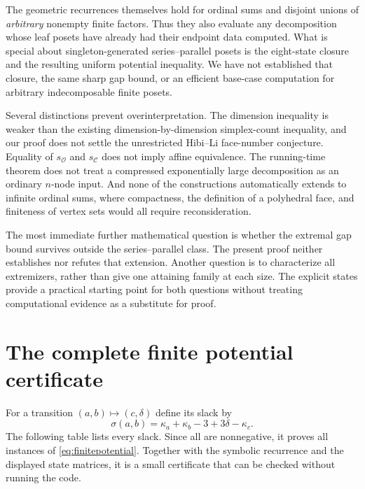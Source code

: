 \documentclass[11pt]{article}
\theoremstyle{definition}
\newcommand{\OO}{\mathcal O}
\newcommand{\CC}{\mathcal C}
\newcommand{\sO}{s_{\OO}}
\newcommand{\sC}{s_{\CC}}
\begin{document}
The geometric recurrences themselves hold for ordinal sums and disjoint unions of \emph{arbitrary} nonempty finite factors. Thus they also evaluate any decomposition whose leaf posets have already had their endpoint data computed. What is special about singleton-generated series--parallel posets is the eight-state closure and the resulting uniform potential inequality. We have not established that closure, the same sharp gap bound, or an efficient base-case computation for arbitrary indecomposable finite posets.

Several distinctions prevent overinterpretation. The dimension inequality is weaker than the existing dimension-by-dimension simplex-count inequality, and our proof does not settle the unrestricted Hibi--Li face-number conjecture. Equality of $\sO$ and $\sC$ does not imply affine equivalence. The running-time theorem does not treat a compressed exponentially large decomposition as an ordinary $n$-node input. And none of the constructions automatically extends to infinite ordinal sums, where compactness, the definition of a polyhedral face, and finiteness of vertex sets would all require reconsideration.

The most immediate further mathematical question is whether the extremal gap bound survives outside the series--parallel class. The present proof neither establishes nor refutes that extension. Another question is to characterize all extremizers, rather than give one attaining family at each size. The explicit states provide a practical starting point for both questions without treating computational evidence as a substitute for proof.

\appendix
\section{The complete finite potential certificate}\label{app:certificate}
For a transition $(a,b)\mapsto(c,\delta)$ define its slack by
\[
\sigma(a,b)=\kappa_a+\kappa_b-3+3\delta-\kappa_c.
\]
The following table lists every slack. Since all are nonnegative, it proves all instances of \eqref{eq:finitepotential}. Together with the symbolic recurrence and the displayed state matrices, it is a small certificate that can be checked without running the code.
\end{document}
